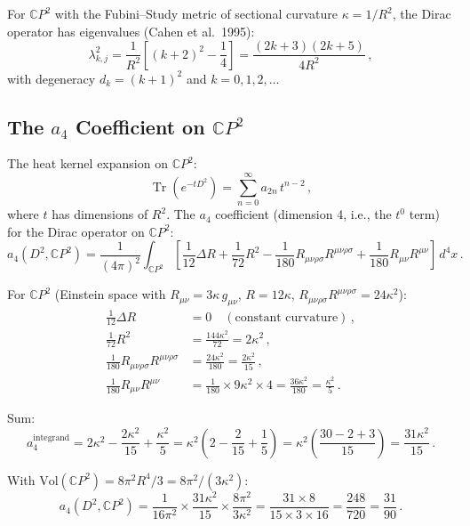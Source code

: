 \documentclass[11pt,a4paper]{article}
\newcommand{\Tr}{\operatorname{Tr}}
\newcommand{\CP}{\mathbb{C}P}
\begin{document}
For $\CP^2$ with the Fubini--Study metric of sectional curvature $\kappa = 1/R^2$, the Dirac operator has eigenvalues (Cahen et al.\ 1995):
\begin{equation}
\lambda_{k,j}^2 = \frac{1}{R^2}\left[(k + 2)^2 - \frac{1}{4}\right] = \frac{(2k+3)(2k+5)}{4R^2}\,,
\end{equation}
with degeneracy $d_k = (k+1)^2$ and $k = 0, 1, 2, \ldots$

\subsection{The $a_4$ Coefficient on $\CP^2$}

The heat kernel expansion on $\CP^2$:
\begin{equation}
\Tr(e^{-tD^2}) = \sum_{n=0}^{\infty} a_{2n}\,t^{n-2}\,,
\end{equation}
where $t$ has dimensions of $R^2$. The $a_4$ coefficient (dimension 4, i.e., the $t^0$ term) for the Dirac operator on $\CP^2$:
\begin{equation}
a_4(D^2, \CP^2) = \frac{1}{(4\pi)^2}\int_{\CP^2}\left[\frac{1}{12}\Delta R + \frac{1}{72}R^2 - \frac{1}{180}R_{\mu\nu\rho\sigma}R^{\mu\nu\rho\sigma} + \frac{1}{180}R_{\mu\nu}R^{\mu\nu}\right]\,d^4x\,.
\end{equation}

For $\CP^2$ (Einstein space with $R_{\mu\nu} = 3\kappa\,g_{\mu\nu}$, $R = 12\kappa$, $R_{\mu\nu\rho\sigma}R^{\mu\nu\rho\sigma} = 24\kappa^2$):
\begin{align}
\frac{1}{12}\Delta R &= 0\quad(\text{constant curvature})\,, \\
\frac{1}{72}R^2 &= \frac{144\kappa^2}{72} = 2\kappa^2\,, \\
\frac{1}{180}R_{\mu\nu\rho\sigma}R^{\mu\nu\rho\sigma} &= \frac{24\kappa^2}{180} = \frac{2\kappa^2}{15}\,, \\
\frac{1}{180}R_{\mu\nu}R^{\mu\nu} &= \frac{1}{180}\times 9\kappa^2 \times 4 = \frac{36\kappa^2}{180} = \frac{\kappa^2}{5}\,.
\end{align}

Sum:
\begin{equation}
a_4^{\mathrm{integrand}} = 2\kappa^2 - \frac{2\kappa^2}{15} + \frac{\kappa^2}{5} = \kappa^2\left(2 - \frac{2}{15} + \frac{1}{5}\right) = \kappa^2\left(\frac{30 - 2 + 3}{15}\right) = \frac{31\kappa^2}{15}\,.
\end{equation}

With $\mathrm{Vol}(\CP^2) = 8\pi^2 R^4 / 3 = 8\pi^2/(3\kappa^2)$:
\begin{equation}
a_4(D^2, \CP^2) = \frac{1}{16\pi^2}\times\frac{31\kappa^2}{15}\times\frac{8\pi^2}{3\kappa^2} = \frac{31 \times 8}{15 \times 3 \times 16} = \frac{248}{720} = \frac{31}{90}\,.
\end{equation}
\end{document}
